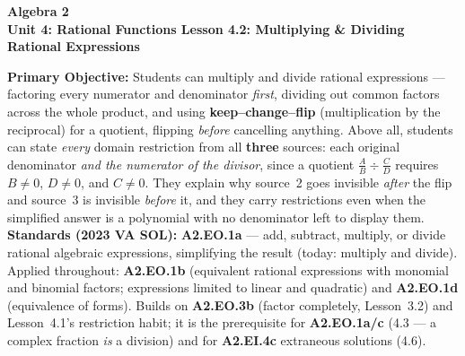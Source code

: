 \documentclass[10pt]{article}
\newcommand{\CourseName}{Algebra 2}
\newcommand{\UnitNumberName}{Unit 4: Rational Functions \quad}
\newcommand{\LessonNumberName}{Lesson 4.2: Multiplying \& Dividing Rational Expressions}
\begin{document}
\begin{center}
    {\Large\bfseries \CourseName \\
    {\small\bfseries \UnitNumberName \LessonNumberName}}
\end{center}

\begin{tcolorbox}[colback=forestbg, colframe=forest, boxrule=0.9pt, arc=2mm,
    left=2mm, right=2mm, top=1.5mm, bottom=1.5mm]
    \textbf{Primary Objective:} Students can multiply and divide rational expressions --- factoring
    every numerator and denominator \emph{first}, dividing out common factors across the whole
    product, and using \textbf{keep--change--flip} (multiplication by the reciprocal) for a quotient,
    flipping \emph{before} cancelling anything. Above all, students can state \emph{every} domain
    restriction from all \textbf{three} sources: each original denominator \emph{and the numerator of
    the divisor}, since a quotient $\frac{A}{B}\div\frac{C}{D}$ requires $B\neq0$, $D\neq0$, and
    $C\neq0$. They explain why source~2 goes invisible \emph{after} the flip and source~3 is invisible
    \emph{before} it, and they carry restrictions even when the simplified answer is a polynomial with
    no denominator left to display them.
    \\[2pt]
    \textbf{Standards (2023 VA SOL):} \textbf{A2.EO.1a} --- add, subtract, multiply, or divide rational
    algebraic expressions, simplifying the result (today: multiply and divide). Applied throughout:
    \textbf{A2.EO.1b} (equivalent rational expressions with monomial and binomial factors; expressions
    limited to linear and quadratic) and \textbf{A2.EO.1d} (equivalence of forms). Builds on
    \textbf{A2.EO.3b} (factor completely, Lesson~3.2) and Lesson~4.1's restriction habit; it is the
    prerequisite for \textbf{A2.EO.1a/c} (4.3 --- a complex fraction \emph{is} a division) and for
    \textbf{A2.EI.4c} extraneous solutions (4.6).
\end{tcolorbox}
\end{document}
